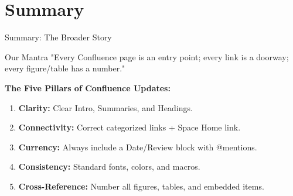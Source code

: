 \documentclass[10pt, aspectratio=169]{beamer}
\begin{document}
	\section{Summary}
	\begin{frame}{Summary: The Broader Story}
		\begin{block}{Our Mantra}
			"Every Confluence page is an entry point; every link is a doorway; every figure/table has a number."
		\end{block}
		\pause
		\textbf{The Five Pillars of Confluence Updates:}
		\begin{enumerate}
			\item \textbf{Clarity:} Clear Intro, Summaries, and Headings.
			\item \textbf{Connectivity:} Correct categorized links + Space Home link.
			\item \textbf{Currency:} Always include a Date/Review block with @mentions.
			\item \textbf{Consistency:} Standard fonts, colors, and macros.
			\item \textbf{Cross-Reference:} Number all figures, tables, and embedded items.
		\end{enumerate}
		\vfill
		\centering
		\href{https://confluence.yourcompany.com/display/SPACE}{}
	\end{frame}
	
\end{document}
